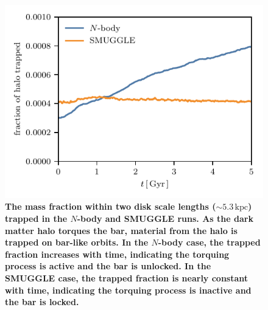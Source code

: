 \documentclass[twocolumn,linenumbers,trackchanges]{aastex631}
\newcommand{\Nbody}{$N$-body}
\newcommand{\SMUGGLE}{SMUGGLE}
\begin{document}
\begin{figure}
    \centering
    \includegraphics[width=\columnwidth]{fig/halo_trapped.pdf}
    \caption{{\bf The mass fraction within two disk scale lengths
    ($\sim5.3\,\textrm{kpc}$) trapped in the \Nbody{} and \SMUGGLE{} runs. As
    the dark matter halo torques the bar, material from the halo is trapped on
    bar-like orbits. In the \Nbody{} case, the trapped fraction increases with
    time, indicating the torquing process is active and the bar is unlocked. In
    the \SMUGGLE{} case, the trapped fraction is nearly constant with time,
    indicating the torquing process is inactive and the bar is locked.}}
    \label{fig:htrap}
\end{figure}
\end{document}

